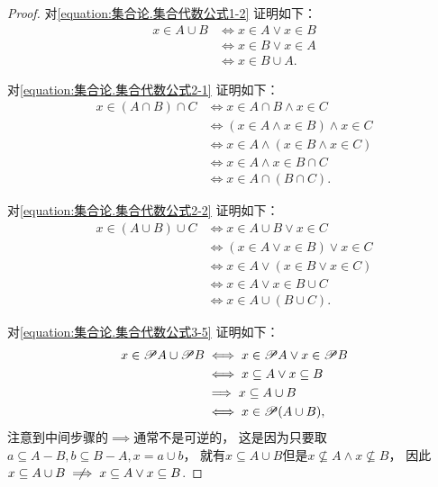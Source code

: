 \begin{property}
\begin{proof}
对\cref{equation:集合论.集合代数公式1-2} 证明如下：
\begin{align*}
	x \in A \cup B
	&\iff x \in A \lor x \in B \\
	&\iff x \in B \lor x \in A \\
	&\iff x \in B \cup A.
\end{align*}

对\cref{equation:集合论.集合代数公式2-1} 证明如下：
\begin{align*}
	x \in (A \cap B) \cap C
	&\iff x \in A \cap B \land x \in C \\
	&\iff (x \in A \land x \in B) \land x \in C \\
	&\iff x \in A \land (x \in B \land x \in C) \\
	&\iff x \in A \land x \in B \cap C \\
	&\iff x \in A \cap (B \cap C).
\end{align*}

对\cref{equation:集合论.集合代数公式2-2} 证明如下：
\begin{align*}
	x \in (A \cup B) \cup C
	&\iff x \in A \cup B \lor x \in C \\
	&\iff (x \in A \lor x \in B) \lor x \in C \\
	&\iff x \in A \lor (x \in B \lor x \in C) \\
	&\iff x \in A \lor x \in B \cup C \\
	&\iff x \in A \cup (B \cup C).
\end{align*}

对\cref{equation:集合论.集合代数公式3-5} 证明如下：
\begin{align*}
	x \in \mathscr{P} A \cup \mathscr{P} B
	&\iff x \in \mathscr{P} A \lor x \in \mathscr{P} B \\
	&\iff x \subseteq A \lor x \subseteq B \\
	&\implies x \subseteq A \cup B \\
	&\iff x \in \mathscr{P} (A \cup B),
\end{align*}
注意到中间步骤的\(\implies\)通常不是可逆的，
这是因为只要取\(a \subseteq A - B, b \subseteq B - A, x = a \cup b\)，
就有\(x \subseteq A \cup B\)但是\(x \not\subseteq A \land x \not\subseteq B\)，
因此\(x \subseteq A \cup B \notimplies x \subseteq A \lor x \subseteq B\).


\end{proof}
\end{property}
